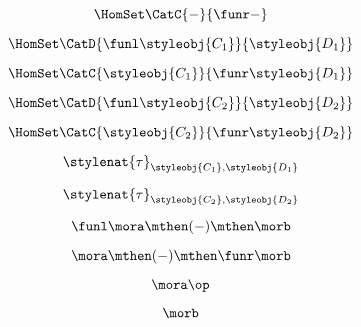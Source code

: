 \begin{forslides}
     \begin{equation}
        \label{eq:slides_adjunctions_61}
       \HomSet\CatC{-}{\funr - }
    \end{equation}
    
     \begin{equation}
        \label{eq:slides_adjunctions_62}
       \HomSet\CatD{\funl \styleobj{C_1}}{\styleobj{D_1}} 
    \end{equation}
    
     \begin{equation}
        \label{eq:slides_adjunctions_63}
       \HomSet\CatC{\styleobj{C_1}}{\funr \styleobj{D_1} }
    \end{equation}
    
     \begin{equation}
        \label{eq:slides_adjunctions_64}
        \HomSet\CatD{\funl \styleobj{C_2}}{\styleobj{D_2}}
    \end{equation}
    
     \begin{equation}
        \label{eq:slides_adjunctions_65}
       \HomSet\CatC{\styleobj{C_2}}{\funr \styleobj{D_2} }
    \end{equation}
    
     \begin{equation}
        \label{eq:slides_adjunctions_66}
        \stylenat{\tau}_{\styleobj{C_1},\styleobj{D_1}}
    \end{equation}
    
    \begin{equation}
        \label{eq:slides_adjunctions_67}
        \stylenat{\tau}_{\styleobj{C_2},\styleobj{D_2}}
    \end{equation}
    
     \begin{equation}
        \label{eq:slides_adjunctions_68}
       \funl \mora \mthen ( - ) \mthen \morb 
    \end{equation}
    
     \begin{equation}
        \label{eq:slides_adjunctions_69}
       \mora \mthen ( - ) \mthen \funr \morb
    \end{equation}
    
     \begin{equation}
        \label{eq:slides_adjunctions_70}
       \mora \op
    \end{equation}
    
    \begin{equation}
        \label{eq:slides_adjunctions_71}
       \morb
    \end{equation}
    

\end{forslides}
